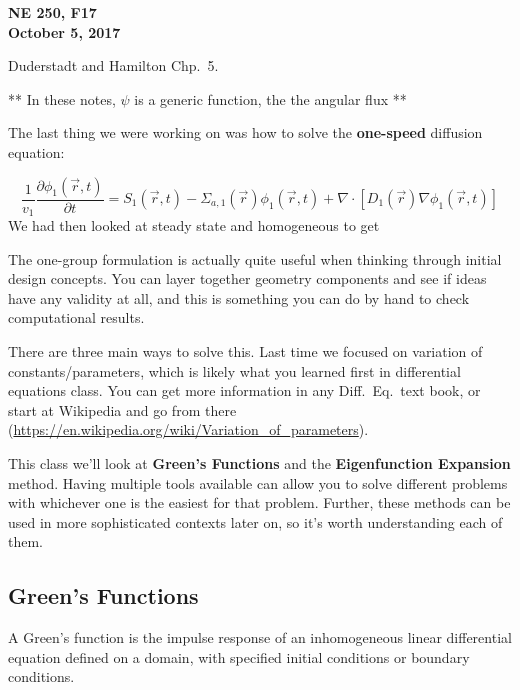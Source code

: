 \documentclass[12pt]{article}
\newif\ifeqns
\newcommand{\rvec}{\ensuremath{\vec{r}}}
\newcommand{\vecr}{\ensuremath{\vec{r}}}
\begin{document}
\begin{center}
{\bf NE 250, F17\\
October 5, 2017 
}
\end{center}

Duderstadt and Hamilton Chp.\ 5.

** In these notes, $\psi$ is a generic function, the the angular flux **

The last thing we were working on was how to solve the \textbf{one-speed} diffusion equation:

\begin{equation*}
\frac{1}{v_1}\frac{\partial \phi_1(\rvec,t)}{\partial t} = S_1(\rvec,t) - 
\Sigma_{a,1}(\rvec)\phi_1(\rvec,t) + \nabla\cdot[D_1(\rvec)\nabla\phi_1(\rvec,t)]
\end{equation*}
We had then looked at steady state and homogeneous to get 
\ifeqns
\begin{equation*}
\nabla^2\phi(\vecr) - \frac{1}{L^2}\phi(\rvec) = -\frac{S(\rvec)}{D},
\end{equation*}
\else
\vspace*{3em}
\fi

The one-group formulation is actually quite useful when thinking through initial design concepts. You can layer together geometry components and see if ideas have any validity at all, and this is something you can do by hand to check computational results. 

There are three main ways to solve this. Last time we focused on variation of constants/parameters, which is likely what you learned first in differential equations class. You can get more information in any Diff.\ Eq.\ text book, or start at Wikipedia and go from there (\url{https://en.wikipedia.org/wiki/Variation_of_parameters}).

This class we'll look at \textbf{Green's Functions} and the \textbf{Eigenfunction Expansion} method. Having multiple tools available can allow you to solve different problems with whichever one is the easiest for that problem. Further, these methods can be used in more sophisticated contexts later on, so it's worth understanding each of them. 

\subsection*{Green's Functions}
A Green's function is the impulse response of an inhomogeneous linear differential equation defined on a domain, with specified initial conditions or boundary conditions.
\end{document}
